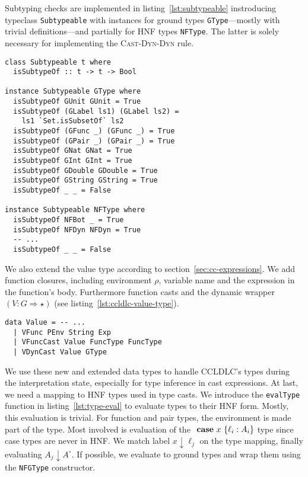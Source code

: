 Subtyping checks are implemented in listing~\ref{lst:subtypeable} instroducing typeclass \texttt{Subtypeable} with instances for ground types \texttt{GType}---mostly with trivial definitions---and partially for HNF types \texttt{NFType}. The latter is solely necessary for implementing the \textsc{Cast-Dyn-Dyn} rule.

\begin{lstlisting}[float,
  label=lst:subtypeable,
  caption=Subtypeable typeclass (\texttt{ProcessEnvironment.hs})]
class Subtypeable t where
  isSubtypeOf :: t -> t -> Bool

instance Subtypeable GType where
  isSubtypeOf GUnit GUnit = True
  isSubtypeOf (GLabel ls1) (GLabel ls2) =
    ls1 `Set.isSubsetOf` ls2
  isSubtypeOf (GFunc _) (GFunc _) = True
  isSubtypeOf (GPair _) (GPair _) = True
  isSubtypeOf GNat GNat = True
  isSubtypeOf GInt GInt = True
  isSubtypeOf GDouble GDouble = True
  isSubtypeOf GString GString = True
  isSubtypeOf _ _ = False

instance Subtypeable NFType where
  isSubtypeOf NFBot _ = True
  isSubtypeOf NFDyn NFDyn = True
  -- ...
  isSubtypeOf _ _ = False
\end{lstlisting}

We also extend the value type according to section~\ref{sec:cc-expressions}. We add function closures, including environment $\rho$, variable name and the expression in the function's body. Furthermore function casts and the dynamic wrapper $(V : G \Rightarrow \star)$ (see listing~\ref{lst:ccldlc-value-type}).

\begin{lstlisting}[float,
  label=lst:ccldlc-value-type,
  caption=Value type extensions (\texttt{ProcessEnvironment.hs})]
data Value = -- ...
  | VFunc PEnv String Exp
  | VFuncCast Value FuncType FuncType
  | VDynCast Value GType
\end{lstlisting}

We use these new and extended data types to handle CCLDLC's types during the interpretation state, especially for type inference in cast expressions. At last, we need a mapping to HNF types used in type casts. We introduce the \texttt{evalType} function in listing~\ref{lst:type-eval} to evaluate types to their HNF form. Mostly, this evaluation is trivial. For function and pair types, the environment is made part of the type. Most involved is evaluation of the $\text{ \textbf{case} } x~\{\ell_i : A_i\}$ type since case types are never in HNF. We match label $x \downarrow \ell_j$ on the type mapping, finally evaluating $A_j \downarrow A^\circ$. If possible, we evaluate to ground types and wrap them using the \texttt{NFGType} constructor.

